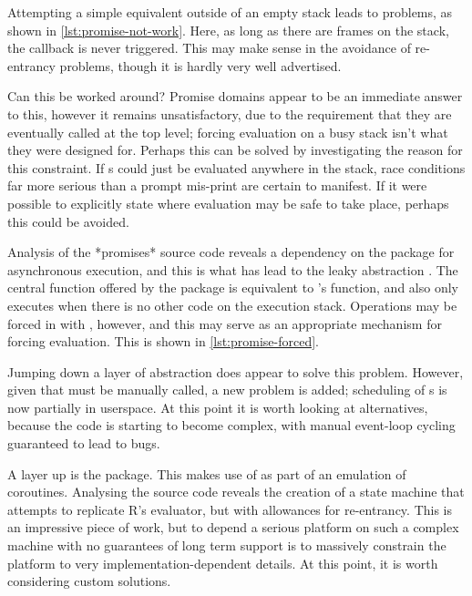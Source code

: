 Attempting a simple equivalent outside of an empty stack leads to problems, as shown in \cref{lst:promise-not-work}.
Here, as long as there are frames on the stack, the  callback is never triggered.
This may make sense in the avoidance of re-entrancy problems, though it is hardly very well advertised.


Can this be worked around?
Promise domains appear to be an immediate answer to this, however it remains unsatisfactory, due to the requirement that they are eventually called at the top level; forcing evaluation on a busy stack isn't what they were designed for.
Perhaps this can be solved by investigating the reason for this constraint.
If s could just be evaluated anywhere in the stack, race conditions far more serious than a prompt mis-print are certain to manifest.
If it were possible to explicitly state where evaluation may be safe to take place, perhaps this could be avoided.

Analysis of the *promises* source code reveals a dependency on the  package for asynchronous execution, and this is what has lead to the leaky abstraction \cite{chang2021later}.
The central  function offered by the package is equivalent to 's  function, and also only executes when there is no other \R code on the execution stack.
Operations may be forced in  with , however, and this may serve as an appropriate mechanism for forcing evaluation.
This is shown in \cref{lst:promise-forced}.


Jumping down a layer of abstraction does appear to solve this problem.
However, given that  must be manually called, a new problem is added; scheduling of s is now partially in userspace.
At this point it is worth looking at alternatives, because the code is starting to become complex, with manual event-loop cycling guaranteed to lead to bugs.

A layer up is the  package\cite{henry21coro}.
This makes use of  as part of an emulation of coroutines.
Analysing the source code reveals the creation of a state machine that attempts to replicate R's evaluator, but with allowances for re-entrancy.
This is an impressive piece of work, but to depend a serious platform on such a complex machine with no guarantees of long term support is to massively constrain the platform to very implementation-dependent details.
At this point, it is worth considering custom solutions.

